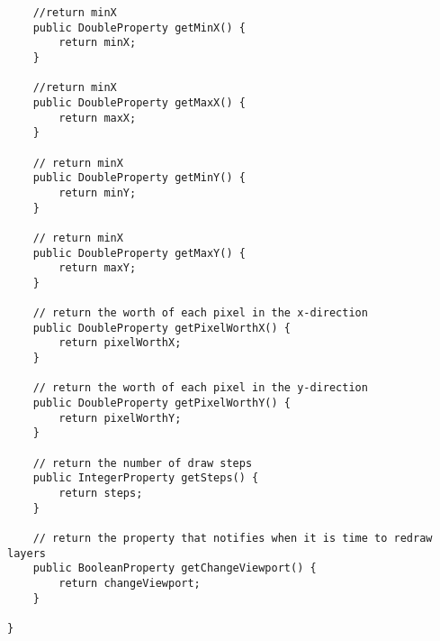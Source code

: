 \documentclass[../../../../main.tex]{subfiles}
\begin{document}
\begin{verbatim}
	//return minX
	public DoubleProperty getMinX() {
		return minX;
	}
	
	//return minX
	public DoubleProperty getMaxX() {
		return maxX;
	}
	
	// return minX
	public DoubleProperty getMinY() {
		return minY;
	}
	
	// return minX
	public DoubleProperty getMaxY() {
		return maxY;
	}
	
	// return the worth of each pixel in the x-direction
	public DoubleProperty getPixelWorthX() {
		return pixelWorthX;
	}
	
	// return the worth of each pixel in the y-direction
	public DoubleProperty getPixelWorthY() {
		return pixelWorthY;
	}

	// return the number of draw steps
	public IntegerProperty getSteps() {
		return steps;
	}
	
	// return the property that notifies when it is time to redraw layers
	public BooleanProperty getChangeViewport() {
		return changeViewport;
	}

}
\end{verbatim}
\newpage
\end{document}
